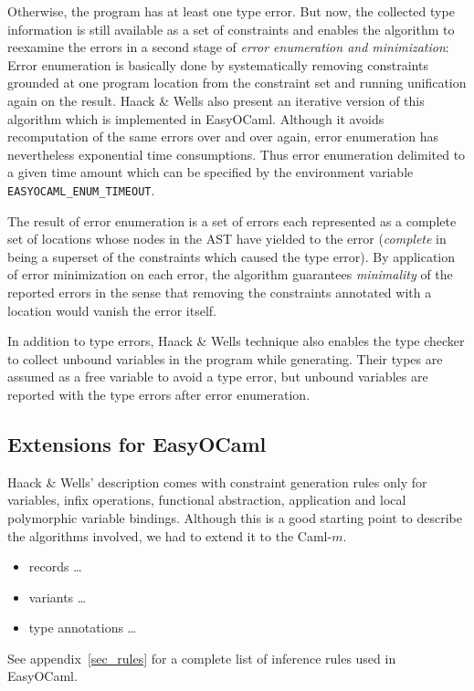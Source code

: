 Otherwise, the program has at least one type error. But now, the 
collected type information is still available as a set of constraints 
and enables the algorithm to reexamine the errors in a second stage of 
\emph{error enumeration and minimization}: Error enumeration is 
basically done by systematically removing constraints grounded at one 
program location from the constraint set and running unification again 
on the result. Haack \& Wells also present an iterative version of this 
algorithm which is implemented in EasyOCaml. Although it avoids 
recomputation of the same errors over and over again, error enumeration 
has nevertheless exponential time consumptions. Thus error enumeration 
delimited to a given time amount which can be specified by the 
environment variable \texttt{EASYOCAML\_ENUM\_TIMEOUT}.

The result of error enumeration is a set of errors each represented as a 
complete set of locations whose nodes in the AST have yielded to the 
error (\emph{complete} in being a superset of the constraints which 
caused the type error). By application of error minimization on each 
error, the algorithm guarantees \emph{minimality} of the reported errors 
in the sense that removing the constraints annotated with a location 
would vanish the error itself.

In addition to type errors, Haack \& Wells technique also enables the 
type checker to collect unbound variables in the program while 
generating. Their types are assumed as a free variable to avoid a type 
error, but unbound variables are reported with the type errors after 
error enumeration.


\subsection{Extensions for EasyOCaml}
\label{hd002002}
Haack \& Wells' description comes with constraint generation rules only 
for variables, infix operations, functional abstraction, application and 
local polymorphic variable bindings. Although this is a good starting 
point to describe the algorithms involved, we had to extend it to the 
Caml-$m$.

\begin{itemize}
    \item records \ldots{}
    \item variants \ldots{}
    \item type annotations \ldots{}
\end{itemize}
\what
See appendix~\ref{sec_rules} for a complete list of inference rules used 
in EasyOCaml.
